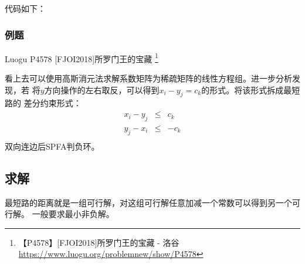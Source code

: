 代码如下：


\subsubsection{例题}
Luogu P4578 [FJOI2018]所罗门王的宝藏
\footnote{【P4578】[FJOI2018]所罗门王的宝藏 - 洛谷
\url{https://www.luogu.org/problemnew/show/P4578}}

看上去可以使用高斯消元法求解系数矩阵为稀疏矩阵的线性方程组。进一步分析发现，若
将$y$方向操作的左右取反，可以得到$x_i-y_j=c_k$的形式。将该形式拆成最短路的
差分约束形式：
\begin{eqnarray*}
    x_i-y_j&\leq& c_k\\
    y_j-x_i&\leq& -c_k\\
\end{eqnarray*}
双向连边后SPFA判负环。

\subsection{求解}
最短路的距离就是一组可行解，对这组可行解任意加减一个常数可以得到另一个可行解。
一般要求最小非负解。
